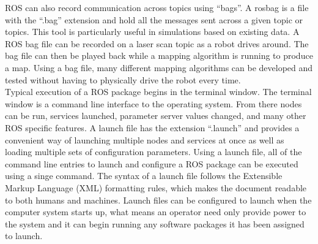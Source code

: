 ROS can also record communication across topics using ``bags''. A rosbag is a file with the ``.bag'' extension and hold all the messages sent across a given topic or topics. This tool is particularly useful in simulations based on existing data. A ROS bag file can be recorded on a laser scan topic as a robot drives around. The bag file can then be played back while a mapping algorithm is running to produce a map. Using a bag file, many different mapping algorithms can be developed and tested without having to physically drive the robot every time.\\

Typical execution of a ROS package begins in the terminal window. The terminal window is a command line interface to the operating system. From there nodes can be run, services launched, parameter server values changed, and many other ROS specific features. A launch file has the extension ``.launch'' and provides a convenient way of launching multiple nodes and services at once as well as loading multiple sets of configuration parameters. Using a launch file, all of the command line entries to launch and configure a ROS package can be executed using a singe command. The syntax of a launch file follows the Extensible Markup Language (XML) formatting rules, which makes the document readable to both humans and machines. Launch files can be configured to launch when the computer system starts up, what means an operator need only provide power to the system and it can begin running any software packages it has been assigned to launch.\\